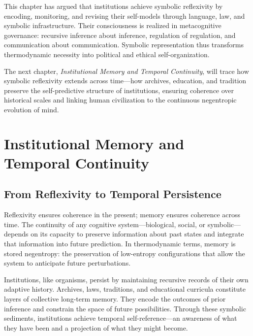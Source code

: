 \documentclass[11pt,a4paper]{article}
\begin{document}
This chapter has argued that institutions achieve symbolic reflexivity by encoding, monitoring, and revising their self-models through language, law, and symbolic infrastructure.  Their consciousness is realized in metacognitive governance: recursive inference about inference, regulation of regulation, and communication about communication.  Symbolic representation thus transforms thermodynamic necessity into political and ethical self-organization.

The next chapter, \textit{Institutional Memory and Temporal Continuity}, will trace how symbolic reflexivity extends across time—how archives, education, and tradition preserve the self-predictive structure of institutions, ensuring coherence over historical scales and linking human civilization to the continuous negentropic evolution of mind.


\section{Institutional Memory and Temporal Continuity}
\label{sec:institutional-memory}

\subsection{From Reflexivity to Temporal Persistence}

Reflexivity ensures coherence in the present; memory ensures coherence across time.  The continuity of any cognitive system—biological, social, or symbolic—depends on its capacity to preserve information about past states and integrate that information into future prediction.  In thermodynamic terms, memory is stored negentropy: the preservation of low-entropy configurations that allow the system to anticipate future perturbations.  

Institutions, like organisms, persist by maintaining recursive records of their own adaptive history.  Archives, laws, traditions, and educational curricula constitute layers of collective long-term memory.  They encode the outcomes of prior inference and constrain the space of future possibilities.  Through these symbolic sediments, institutions achieve temporal self-reference—an awareness of what they have been and a projection of what they might become.
\end{document}
